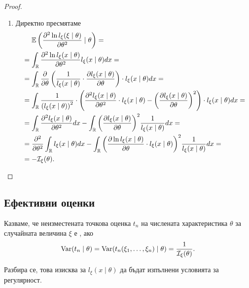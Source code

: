 \documentclass[numbers=endperiod, bibliography=totocnumbered]{scrartcl}
\begin{document}
\begin{proof}
\begin{enumerate}
    \item Директно пресмятаме
    \begin{align*}
      &~~~~\mathbb{E}\left( \frac {\partial^2 \ln l_\xi(\xi \mid \theta)} {\partial \theta^2} \mid \theta \right)
      = \\ &=
      \int_{\mathbb{R}} \frac {\partial^2 \ln l_\xi(x \mid \theta)} {\partial \theta^2} l_\xi(x \mid \theta) dx
      = \\ &=
      \int_{\mathbb{R}} \frac \partial {\partial \theta} \left(\frac 1 {l_\xi(x \mid \theta)} \cdot \frac {\partial l_\xi(x \mid \theta)} {\partial \theta} \right) \cdot l_\xi(x \mid \theta) dx
      = \\ &=
      \int_{\mathbb{R}} \frac 1 {{(l_\xi(x \mid \theta))}^2} \cdot \left( \frac {\partial^2 l_\xi(x \mid \theta)} {\partial \theta^2} \cdot l_\xi(x \mid \theta) - {\left(\frac {\partial l_\xi(x \mid \theta)} {\partial \theta} \right)}^2 \right) \cdot l_\xi(x \mid \theta) dx
      = \\ &=
      \int_{\mathbb{R}} \frac {\partial^2 l_\xi(x \mid \theta)} {\partial \theta^2} dx - \int_{\mathbb{R}} {\left(\frac {\partial l_\xi(x \mid \theta)} {\partial \theta} \right)}^2 \frac 1 {l_\xi(x \mid \theta)} dx
      = \\ &=
      \frac {\partial^2} {\partial \theta^2} \int_{\mathbb{R}} l_\xi(x \mid \theta) dx - \int_{\mathbb{R}} {\left(\frac {\partial \ln l_\xi(x \mid \theta)} {\partial \theta} \cdot l_\xi(x \mid \theta) \right)}^2 \frac 1 {l_\xi(x \mid \theta)} dx
      = \\ &=
      -\mathcal{I}_\xi(\theta).
    \end{align*}
  \end{enumerate}
\end{proof}

\subsection{Ефективни оценки}

\begin{definition}
  Казваме, че неизместената точкова оценка \( t_n \) на числената характеристика \( \theta \) за случайната величина \( \xi \) е , ако
  \begin{align*}
    \operatorname{Var}(t_n \mid \theta) = \operatorname{Var}(t_n(\xi_1, \ldots, \xi_n) \mid \theta) = \frac 1 {\mathcal{I}_\xi(\theta)}.
  \end{align*}

  Разбира се, това изисква за \( l_\xi(x \mid \theta) \) да бъдат изпълнени условията за регулярност.
\end{definition}
\end{document}
